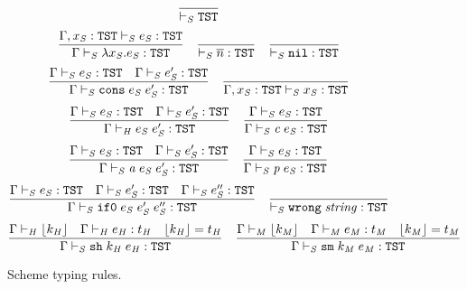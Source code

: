 \begin{figure}[p]
\caption{Scheme typing rules.}
\[
\frac
{}
{ \vdash_{\mathit{S}} \mathtt{TST}}
\]
\bigskip
\[
\frac
{\Gamma , x_{\mathit{S}} : \mathtt{TST} \vdash_{\mathit{S}} e_{\mathit{S}} : \mathtt{TST}}
{\Gamma \vdash_{\mathit{S}} \lambda x_{\mathit{S}} . e_{\mathit{S}} : \mathtt{TST}}
\quad
\frac
{}
{ \vdash_{\mathit{S}} \overline{n} : \mathtt{TST}}
\quad
\frac
{}
{ \vdash_{\mathit{S}} \mathtt{nil} : \mathtt{TST}}
\]
\[
\frac
{\Gamma \vdash_{\mathit{S}} e_{\mathit{S}} : \mathtt{TST} \quad \Gamma \vdash_{\mathit{S}} e_{\mathit{S}}' : \mathtt{TST}}
{\Gamma \vdash_{\mathit{S}} \mathtt{cons} \; e_{\mathit{S}} \; e_{\mathit{S}}' : \mathtt{TST}}
\quad
\frac
{}
{\Gamma , x_{\mathit{S}} : \mathtt{TST} \vdash_{\mathit{S}} x_{\mathit{S}} : \mathtt{TST}}
\]
\[
\frac
{\Gamma \vdash_{\mathit{S}} e_{\mathit{S}} : \mathtt{TST} \quad \Gamma \vdash_{\mathit{S}} e_{\mathit{S}}' : \mathtt{TST}}
{\Gamma\vdash_{\mathit{H}}e_{\mathit{S}} \; e_{\mathit{S}}':\mathtt{TST}}
\quad
\frac
{\Gamma \vdash_{\mathit{S}} e_{\mathit{S}} : \mathtt{TST}}
{\Gamma \vdash_{\mathit{S}} \mathit{c} \; e_{\mathit{S}} : \mathtt{TST}}
\]
\[
\frac
{\Gamma \vdash_{\mathit{S}} e_{\mathit{S}} : \mathtt{TST} \quad \Gamma \vdash_{\mathit{S}} e_{\mathit{S}}' : \mathtt{TST}}
{\Gamma \vdash_{\mathit{S}} \mathit{a} \; e_{\mathit{S}} \; e_{\mathit{S}}' : \mathtt{TST}}
\quad
\frac
{\Gamma \vdash_{\mathit{S}} e_{\mathit{S}} : \mathtt{TST}}
{\Gamma \vdash_{\mathit{S}} \mathit{p} \; e_{\mathit{S}} : \mathtt{TST}}
\]
\[
\frac
{\Gamma \vdash_{\mathit{S}} e_{\mathit{S}} : \mathtt{TST} \quad \Gamma \vdash_{\mathit{S}} e_{\mathit{S}}' : \mathtt{TST} \quad \Gamma \vdash_{\mathit{S}} e_{\mathit{S}}'' : \mathtt{TST}}
{\Gamma \vdash_{\mathit{S}} \mathtt{if0} \; e_{\mathit{S}} \; e_{\mathit{S}}' \; e_{\mathit{S}}'' : \mathtt{TST}}
\quad
\frac
{}
{ \vdash_{\mathit{S}} \mathtt{wrong} \; \mathit{string} : \mathtt{TST}}
\]
\[
\frac
{\Gamma \vdash_{\mathit{H}} \lfloor k_{\mathit{H}} \rfloor \quad \Gamma \vdash_{\mathit{H}} e_{\mathit{H}} : t_{\mathit{H}} \quad \lfloor k_{\mathit{H}} \rfloor = t_{\mathit{H}}}
{\Gamma \vdash_{\mathit{S}} \mathtt{sh} \; k_{\mathit{H}} \; e_{\mathit{H}} : \mathtt{TST}}
\quad
\frac
{\Gamma \vdash_{\mathit{M}} \lfloor k_{\mathit{M}} \rfloor \quad \Gamma \vdash_{\mathit{M}} e_{\mathit{M}} : t_{\mathit{M}} \quad \lfloor k_{\mathit{M}} \rfloor = t_{\mathit{M}}}
{\Gamma \vdash_{\mathit{S}} \mathtt{sm} \; k_{\mathit{M}} \; e_{\mathit{M}} : \mathtt{TST}}
\]
\label{figstr}
\end{figure}